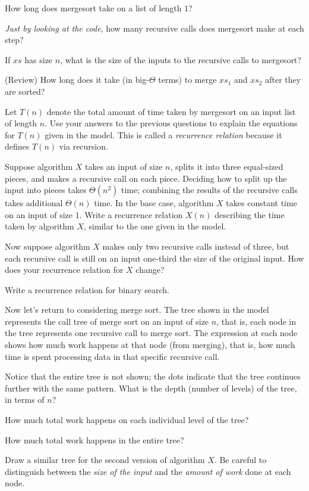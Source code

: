\documentclass{tufte-handout}
\begin{document}
\begin{questions}
  \item How long does \textsf{mergesort} take on a list of length $1$?
  \item \emph{Just by looking at the code}, how many recursive calls does
  \textsf{mergesort} make at each step?
  \item If $xs$ has size $n$, what is the size of the inputs to the
    recursive calls to \textsf{mergesort}?
  \item (Review) How long does it take (in big-$\Theta$ terms) to
    merge $xs_1$ and $xs_2$ after they are sorted?
  \item Let $T(n)$ denote the total amount of time taken by
    \textsf{mergesort} on an input list of length $n$.  Use your
    answers to the previous questions to explain the equations for
    $T(n)$ given in the model.  This is called a \emph{recurrence
      relation} because it defines $T(n)$ via recursion.
  \item Suppose algorithm $X$ takes an input of size $n$, splits it
    into three equal-sized pieces, and makes a recursive call on each
    piece.  Deciding how to split up the input into pieces takes
    $\Theta(n^2)$ time; combining the results of the recursive calls
    takes additional $\Theta(n)$ time.  In the base case, algorithm
    $X$ takes constant time on an input of size $1$. Write a
    recurrence relation $X(n)$ describing the time taken by algorithm
    $X$, similar to the one given in the model.
  \item Now suppose algorithm $X$ makes only two recursive calls instead
    of three, but each recursive call is still on an input one-third
    the size of the original input.  How does your recurrence relation
    for $X$ change?
  \item Write a recurrence relation for binary search.
\end{questions}

\newpage
Now let's return to considering merge sort.  The tree shown in
the model represents the call tree of merge sort on an input of
size $n$, that is, each node in the tree represents one recursive call
to merge sort.  The expression at each node shows how much work
happens at that node (from merging), that is, how much time is spent
processing data in that specific recursive call.

\begin{questions}
  \item Notice that the entire tree is not shown; the dots indicate
    that the tree continues further with the same pattern.  What is
    the depth (number of levels) of the tree, in terms of $n$?
  \item How much total work happens on each individual level of the tree?
  \item How much total work happens in the entire tree?
  \item Draw a similar tree for the second version of algorithm
    $X$. Be careful to distinguish between the \emph{size of the
      input} and the \emph{amount of work} done at each node.
\end{questions}
\end{document}
